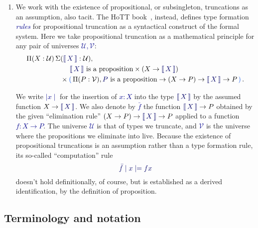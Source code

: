 \documentclass[10pt]{article}
\makeatletter
\newcommand{\db}{\textcolor{darkblue}}
\newcommand\leftcolor[2]{%
  \edef\@tempa{#1}%
  \ifx\@tempa\@empty
    \edef\@tempa{darkblue}%
  \fi
 \mathinner\bgroup\begingroup\color{\@tempa}\left#2\normalcolor%
}
\newcommand\rightcolor[2]{%
  \edef\@tempa{#1}%
  \ifx\@tempa\@empty
    \edef\@tempa{darkblue}%
  \fi
  \color{\@tempa}\right#2\endgroup\egroup%
}
\newcommand{\bracket}[1]{\leftcolor{darkgreen}(\,#1\,\rightcolor{darkgreen})}
\newcommand{\trunc}[1]{\leftcolor{darkblue}\llbracket\,\db{#1}\,\rightcolor{darkblue}\rrbracket}
\newcommand{\df}[1]{\emph{\db{#1}}}
\newcommand{\m}[1]{\db{$#1$}}
\newcommand{\M}[1]{\[\db{#1}\]}
\newcommand{\U}{\mathcal{U}}
\newcommand{\V}{\mathcal{V}}
\theoremstyle{definition}
\makeatother
\begin{document}
\begin{enumerate}
\item We work with the existence of propositional, or subsingleton, truncations as an
  assumption, also tacit.  The HoTT book~\cite{hottbook}, instead,
  defines type formation \df{rules} for propositional truncation as a
  syntactical construct of the formal system. Here we take
  propositional truncation as a mathematical principle for any pair of
  universes \m{\U,\V}: \db{
    \begin{align*}
      \Pi (X:\U)\,  \Sigma & (\trunc{X}  : \U), \\
      & \mathrel{\phantom{\times}} \text{\m{\trunc{X}} is a proposition} \times (X \to \trunc{X}) \\
  & \times \bracket{\Pi (P : \V), \text{\m{P} is a proposition} \to (X \to P) \to \trunc{X} \to P}.
    \end{align*}}

  We write \m{\mid x \mid} for the insertion of \m{x:X} into the type
  \m{\trunc{X}} by the assumed function \m{X \to \trunc{X}}.  We also
  denote by \m{\bar{f}} the function \m{\trunc{X} \to P} obtained by
  the given ``elimination rule'' \m{(X \to P) \to \trunc{X} \to P}
  applied to a function \m{f:X \to P}. The universe \m{\U} is that of
  types we truncate, and \m{\V} is the universe where the propositions
  we eliminate into live.  Because the existence of propositional
  truncations is an assumption rather than a type formation rule, its
  so-called ``computation'' rule \M{\bar{f} \mid x \mid = f x} doesn't
  hold definitionally, of course, but is established as a derived
  identification, by the definition of proposition.

\end{enumerate}


\subsection{Terminology and notation}
\label{existence:terminology}
\end{document}
